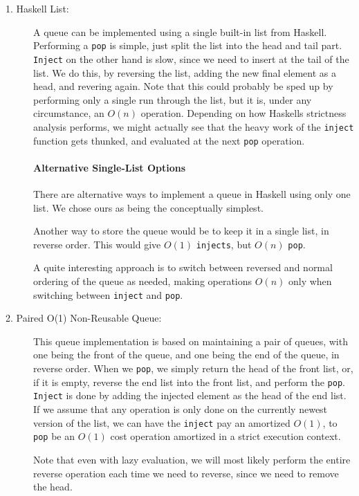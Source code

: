 \begin{description}
\item[1. Haskell List:] 
A queue can be implemented using a single built-in list from Haskell. 
Performing a \texttt{pop} is simple, just split the list into the head and tail part.
\texttt{Inject} on the other hand is slow, since we need to insert at the tail of the list. We do this, by reversing the list, adding the new final element as a head, and revering again. Note that this could probably be sped up by performing only a single run through the list, but it is, under any circumstance, an $O(n)$ operation.
Depending on how Haskells strictness analysis performs, we might actually see that the heavy work of the \texttt{inject} function gets thunked, and evaluated at the next \texttt{pop} operation.

\paragraph{Alternative Single-List Options}

There are alternative ways to implement a queue in Haskell using only one list. We chose ours as being the conceptually simplest.

Another way to store the queue would be to keep it in a single list, in reverse order. This would give $O(1)$ \texttt{injects}, but $O(n)$ \texttt{pop}.

A quite interesting approach is to switch between reversed and normal ordering of the queue as needed, making operations $O(n)$ only when switching between \texttt{inject} and \texttt{pop}. 

\item[2. Paired O(1) Non-Reusable Queue:]
This queue implementation is based on maintaining a pair of queues, with one being the front of the queue, and one being the end of the queue, in reverse order. 
When we \texttt{pop}, we simply return the head of the front list, or, if it is empty, reverse the end list into the front list, and perform the \texttt{pop}.
\texttt{Inject} is done by adding the injected element as the head of the end list.
If we assume that any operation is only done on the currently newest version of the list, we can have the \texttt{inject} pay an amortized $O(1)$, to \texttt{pop} be an $O(1)$ cost operation amortized in a strict execution context.

Note that even with lazy evaluation, we will most likely perform the entire reverse operation each time we need to reverse, since we need to remove the head.


\end{description}
